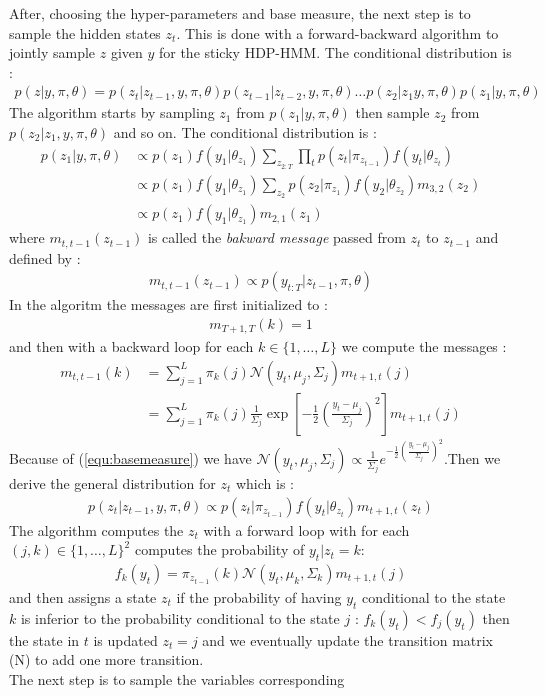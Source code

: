 After, choosing the hyper-parameters and base measure, the next step is to sample the hidden states $z_t$. This is done with a forward-backward algorithm to jointly sample $z$ given $y$ for the sticky HDP-HMM. The conditional distribution is : 
\begin{align*}
	p(z|y, \pi, \theta) = p(z_t|z_{t-1}, y, \pi, \theta) p(z_{t-1}|z_{t-2}, y, \pi, \theta) \dots p(z_2|z_1 y, \pi, \theta) p(z_1| y, \pi, \theta) 
\end{align*} 
The algorithm starts by sampling $z_1$ from $ p(z_1| y, \pi, \theta)$ then sample $z_2$ from $ p(z_2|z_1, y, \pi, \theta)$ and so on. The conditional distribution is :\begin{align*}
	 p(z_1| y, \pi, \theta) &\propto p(z_1)f(y_1|\theta_{z_1})\sum_{z_{2:T}} \prod_t p(z_t|\pi_{z_{t-1}})f(y_t|\theta_{z_t})\\&\propto  p(z_1)f(y_1|\theta_{z_1}) \sum_{z_2}p(z_2|\pi_{z_1})f(y_2|\theta_{z_2})m_{3,2}(z_2)
	 \\ &\propto  p(z_1)f(y_1|\theta_{z_1})m_{2,1}(z_1)
\end{align*}
where $m_{t,t-1}(z_{t-1})$ is called the \textit{bakward message} passed from $z_t$ to $z_{t-1}$ and defined by : 
\begin{align*}
	m_{t,t-1}(z_{t-1}) \propto p(y_{t:T}|z_{t-1},\pi,\theta)
\end{align*}
In the algoritm the messages are first initialized to :\begin{align*}
	m_{T+1,T}(k)=1
\end{align*}
and then with a backward loop for each $k\in \{1,\dots, L\}$ we compute the messages : \begin{align*}
	m_{t,t-1}(k)&=\sum^L_{j=1}\pi_k(j) \mathcal N(y_t, \mu_j, \Sigma_j)m_{t+1, t}(j)\\
	&=\sum^L_{j=1}\pi_k(j) \frac{1}{\Sigma_j}\exp\left[ -\frac{1}{2} \left( \frac{y_t-\mu_j}{\Sigma_j}\right)^2\right]m_{t+1, t}(j)
\end{align*}
Because of (\ref{equ:basemeasure}) we have $\mathcal N(y_t, \mu_j, \Sigma_j)\propto \frac{1}{\Sigma_j} e^{-\frac{1}{2} \left( \frac{y_t-\mu_j}{\Sigma_j}\right)^2}$.Then we derive the general distribution for $z_t$ which is : 
\begin{align*}
	p(z_t|z_{t-1}, y, \pi,\theta) \propto p(z_t|\pi_{z_{t-1}})f(y_t|\theta_{z_t})m_{t+1,t}(z_t)
\end{align*}
The algorithm computes the $z_t$ with a forward loop  with for each $(j,k)\in \{1,\dots, L\}^2$ computes the probability of $y_t|z_t=k$:
\begin{align*}
	f_k(y_t)=\pi_{z_{t-1}}(k)\mathcal N (y_t,\mu_k,\Sigma_k)m_{t+1,t}(j)
\end{align*}
and then assigns a state $z_t$ if the probability of having $y_t$ conditional to the state $k$ is inferior to the probability conditional to the state $j$  : $f_k(y_t)<f_j(y_t)$ then the state in $t$ is updated $z_t=j$ and we eventually update the transition matrix (N) to add one more transition. \\
The next step is to sample the variables corresponding 



